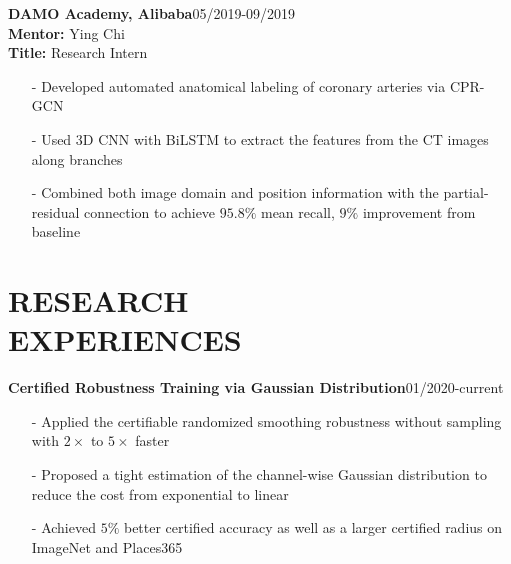 \documentclass[margin]{res}
\begin{document}
\begin{resume}
                \vspace{-1em}  
                
                \textbf{DAMO Academy, Alibaba}\hfill 05/2019-09/2019\\
                \textbf{Mentor:} Ying Chi\\
                \textbf{Title:} Research Intern
                \begin{itemize}\itemsep -2.2pt %
                 \item[-] Developed automated anatomical labeling of coronary arteries via CPR-GCN
                 \item[-] Used 3D CNN with BiLSTM to extract the features from the CT images along branches
                 \item[-] Combined both image domain and position information with the partial-residual connection to achieve $95.8\%$ mean recall, $9\%$ improvement from baseline
                 \end{itemize}

\vspace{-1em}
\section{RESEARCH \\ EXPERIENCES}
                \textbf{Certified Robustness Training via Gaussian Distribution}\hfill 01/2020-current
                \begin{itemize}\itemsep -2.2pt %
                 \item[-] Applied the certifiable randomized smoothing robustness without sampling with $2\times$ to $5\times$ faster
                 \item[-] Proposed a tight estimation of the channel-wise Gaussian distribution to reduce the cost from exponential to linear
                 \item[-] Achieved $5\%$ better certified accuracy as well as a larger certified radius on ImageNet and Places365
                 \end{itemize}

                 \vspace{-1em}  


\end{resume}
\end{document}
